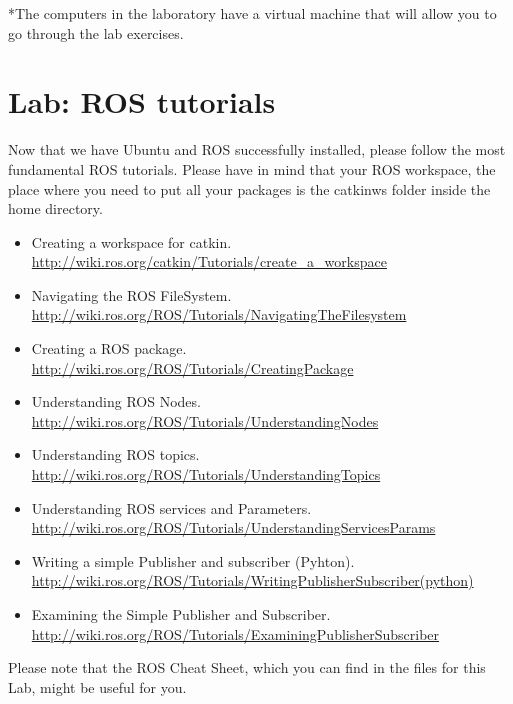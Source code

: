 \documentclass[a4paper,10pt]{article}
\begin{document}
*The computers in the laboratory have a virtual machine that will allow you to go through the lab exercises.

\section{Lab: ROS tutorials}
Now that we have Ubuntu and ROS successfully installed, please follow the most fundamental ROS tutorials. Please have in mind that your ROS workspace, the place where you need to put all your packages is the catkin{\textunderscore}ws folder inside the home directory.

\begin{itemize}
    \item Creating a workspace for catkin.\\
    \url{http://wiki.ros.org/catkin/Tutorials/create_a_workspace}
    
    \item Navigating the ROS FileSystem.\\
    \url{http://wiki.ros.org/ROS/Tutorials/NavigatingTheFilesystem}
    
    \item Creating a ROS package.\\
    \url{http://wiki.ros.org/ROS/Tutorials/CreatingPackage}
    
    \item Understanding ROS Nodes.\\
    \url{http://wiki.ros.org/ROS/Tutorials/UnderstandingNodes}
    
    \item Understanding ROS topics.\\
    \url{http://wiki.ros.org/ROS/Tutorials/UnderstandingTopics}
    
    \item Understanding ROS services and Parameters.\\
    \url{http://wiki.ros.org/ROS/Tutorials/UnderstandingServicesParams}
    
    \item Writing a simple Publisher and subscriber (Pyhton).\\
    \url{http://wiki.ros.org/ROS/Tutorials/WritingPublisherSubscriber(python)}
    
    \item Examining the Simple Publisher and Subscriber.\\
    \url{http://wiki.ros.org/ROS/Tutorials/ExaminingPublisherSubscriber}
\end{itemize}
\noindent
Please note that the ROS Cheat Sheet, which you can find in the files for this Lab, might be useful for you.
\end{document}
